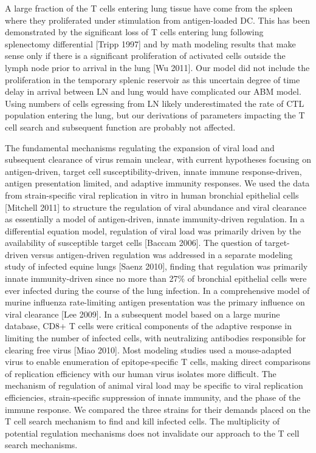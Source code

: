 \documentclass[10pt]{article}
\begin{document}
A large fraction of the T cells entering lung tissue have come from the spleen where they proliferated under stimulation from antigen-loaded DC.  This has been demonstrated by the significant loss of T cells entering lung following splenectomy differential [Tripp 1997] and by math modeling results that make sense only if there is a significant proliferation of activated cells outside the lymph node prior to arrival in the lung [Wu 2011].  Our model did not include the proliferation in the temporary splenic reservoir as this uncertain degree of time delay in arrival between LN and lung would have complicated our ABM model.  Using numbers of cells egressing from LN likely underestimated the rate of CTL population entering the lung, but our derivations of parameters impacting the T cell search and subsequent function are probably not affected.

The fundamental mechanisms regulating the expansion of viral load and subsequent clearance of virus remain unclear, with current hypotheses focusing on antigen-driven, target cell susceptibility-driven, innate immune response-driven, antigen presentation limited, and adaptive immunity responses.  We used the data from strain-specific viral replication in vitro in human bronchial epithelial cells [Mitchell 2011] to structure the regulation of viral abundance and viral clearance as essentially a model of antigen-driven, innate immunity-driven regulation.  In a differential equation model, regulation of viral load was primarily driven by the availability of susceptible target cells [Baccam 2006].  The question of target-driven versus antigen-driven regulation was addressed in a separate modeling study of infected equine lungs [Saenz 2010], finding that regulation was primarily innate immunity-driven since no more than 27\% of bronchial epithelial cells were ever infected during the course of the lung infection.  In a comprehensive model of murine influenza rate-limiting antigen presentation was the primary influence on viral clearance [Lee 2009].  In a subsequent model based on a large murine database, CD8+ T cells were critical components of the adaptive response in limiting the number of infected cells, with neutralizing antibodies responsible for clearing free virus [Miao 2010].   Most modeling studies used a mouse-adapted virus to enable enumeration of epitope-specific T cells, making direct comparisons of replication efficiency with our human virus isolates more difficult.  The mechanism of regulation of animal viral load may be specific to viral replication efficiencies, strain-specific suppression of innate immunity, and the phase of the immune response.  We compared the three strains for their demands placed on the T cell search mechanism to find and kill infected cells. The multiplicity of potential regulation mechanisms does not invalidate our approach to the T cell search mechanisms. 
\end{document}
